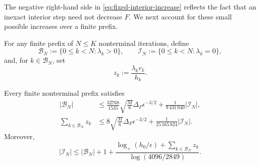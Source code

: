 The negative right-hand side in
\eqref{eq:fixed-interior-increase} reflects the fact that an inexact
interior step need not decrease $F$. We next account for these small
possible increases over a finite prefix.

For any finite prefix of $N\le K$ nonterminal iterations, define
\[
    \mathcal B_N
    :=
    \{0\le k<N:\lambda_k>0\},
    \qquad
    \mathcal I_N
    :=
    \{0\le k<N:\lambda_k=0\},
\]
and, for $k\in\mathcal B_N$, set
\begin{equation}
    z_k
    :=
    \frac{\lambda_kr_k}{h_k}.
    \label{eq:fixed-z-definition}
\end{equation}

\begin{lemma}
\label{lem:fixed-budgets}
Every finite nonterminal prefix satisfies
\begin{subequations}
\label{eq:fixed-boundary-budgets}
\begin{align}
    |\mathcal B_N|
    &\le
    \frac{32768}{1535}
    \sqrt{\frac M6}
    \Delta_F\epsilon^{-3/2}
    +
    \frac1{9\,431\,040}
    |\mathcal I_N|,
    \label{eq:fixed-boundary-count}
    \\
    \sum_{k\in\mathcal B_N}z_k
    &\le
    8\sqrt{\frac M6}
    \Delta_F\epsilon^{-3/2}
    +
    \frac1{25\,165\,824}
    |\mathcal I_N|.
    \label{eq:fixed-z-budget}
\end{align}
\end{subequations}
Moreover,
\begin{equation}
    |\mathcal I_N|
    \le
    |\mathcal B_N|+1
    +
    \frac{
        \log_+(h_0/\epsilon)
        +
        \sum_{k\in\mathcal B_N}z_k
    }{
        \log(4096/2849)
    }.
    \label{eq:fixed-interior-budget}
\end{equation}
\end{lemma}

